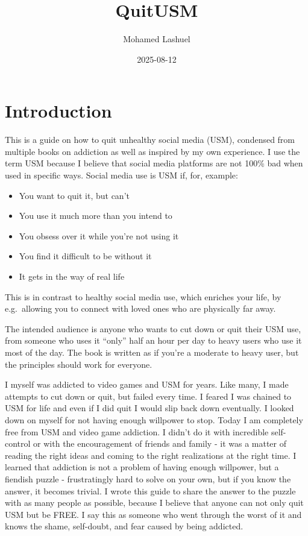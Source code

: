 \documentclass[
  openany]{book}
\title{QuitUSM}
\author{Mohamed Lashuel}
\date{2025-08-12}
\providecommand{\tightlist}{%
  \setlength{\itemsep}{0pt}\setlength{\parskip}{0pt}}
\begin{document}
\maketitle

{
\setcounter{tocdepth}{1}
\tableofcontents
}
\chapter{Introduction}\label{introduction}

This is a guide on how to quit unhealthy social media (USM), condensed from multiple books on addiction as well as inspired by my own experience. I use the term USM because I believe that social media platforms are not 100\% bad when used in specific ways. Social media use is USM if, for, example:

\begin{itemize}
\tightlist
\item
  You want to quit it, but can't
\item
  You use it much more than you intend to
\item
  You obsess over it while you're not using it
\item
  You find it difficult to be without it
\item
  It gets in the way of real life
\end{itemize}

This is in contrast to healthy social media use, which enriches your life, by e.g.~allowing you to connect with loved ones who are physically far away.

The intended audience is anyone who wants to cut down or quit their USM use, from someone who uses it ``only'' half an hour per day to heavy users who use it most of the day. The book is written as if you're a moderate to heavy user, but the principles should work for everyone.

I myself was addicted to video games and USM for years. Like many, I made attempts to cut down or quit, but failed every time. I feared I was chained to USM for life and even if I did quit I would slip back down eventually. I looked down on myself for not having enough willpower to stop. Today I am completely free from USM and video game addiction. I didn't do it with incredible self-control or with the encouragement of friends and family - it was a matter of reading the right ideas and coming to the right realizations at the right time. I learned that addiction is not a problem of having enough willpower, but a fiendish puzzle - frustratingly hard to solve on your own, but if you know the answer, it becomes trivial. I wrote this guide to share the answer to the puzzle with as many people as possible, because I believe that anyone can not only quit USM but be FREE. I say this as someone who went through the worst of it and knows the shame, self-doubt, and fear caused by being addicted.
\end{document}
